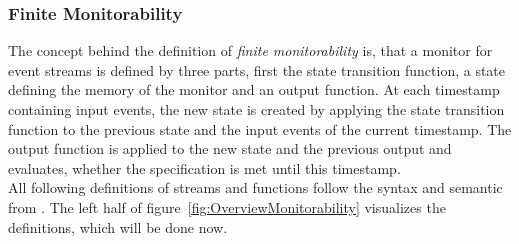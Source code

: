 	\subsubsection{Finite Monitorability}
		The concept behind the definition of \textit{finite monitorability} is, that a monitor for event streams is defined by three parts, first the state transition function, a state defining the memory of the monitor and an output function. At each timestamp containing input events, the new state is created by applying the state transition function to the previous state and the input events of the current timestamp. The output function is applied to the new state and the previous output and evaluates, whether the specification is met until this timestamp.\\
		All following definitions of streams and functions follow the syntax and semantic from \cite{TeSSLa2}. The left half of figure~\ref{fig:OverviewMonitorability} visualizes the definitions, which will be done now.
